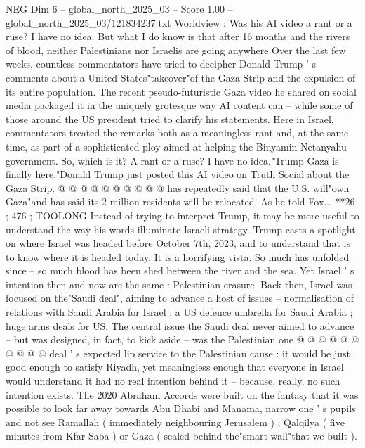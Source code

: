 \begin{textsample}{NEG Dim 6 – global\_north\_2025\_03 – Score 1.00 – global\_north\_2025\_03/121834237.txt}  \label{ex:f6_neg_171}
Worldview : Was his AI video a rant or a ruse?
I have no idea.
But what I do know is that after 16 months and the rivers of blood, neither Palestinians nor Israelis are going anywhere Over the last few weeks, countless commentators have tried to decipher Donald Trump ' s comments about a United States"takeover"of the Gaza Strip and the expulsion of its entire population.
The recent pseudo-futuristic Gaza video he shared on social media packaged it in the uniquely grotesque way AI content can -- while some of those around the US president tried to clarify his statements.
Here in Israel, commentators treated the remarks both as a meaningless rant and, at the same time, as part of a sophisticated ploy aimed at helping the Binyamin Netanyahu government.
So, which is it?
A rant or a ruse?
I have no idea."Trump Gaza is finally here."Donald Trump just posted this AI video on Truth Social about the Gaza Strip. @ @ @ @ @ @ @ @ @ @ has repeatedly said that the U.S. will"own Gaza"and has said its 2 million residents will be relocated.
As he told Fox... **26 ; 476 ; TOOLONG Instead of trying to interpret Trump, it may be more useful to understand the way his words illuminate Israeli strategy.
Trump casts a spotlight on where Israel was headed before October 7th, 2023, and to understand that is to know where it is headed today.
It is a horrifying vista.
So much has unfolded since -- so much blood has been shed between the river and the sea.
Yet Israel ' s intention then and now are the same : Palestinian erasure.
Back then, Israel was focused on the"Saudi deal", aiming to advance a host of issues -- normalisation of relations with Saudi Arabia for Israel ; a US defence umbrella for Saudi Arabia ; huge arms deals for US.
The central issue the Saudi deal never aimed to advance -- but was designed, in fact, to kick aside -- was the Palestinian one @ @ @ @ @ @ @ @ @ @ deal ' s expected lip service to the Palestinian cause : it would be just good enough to satisfy Riyadh, yet meaningless enough that everyone in Israel would understand it had no real intention behind it -- because, really, no such intention exists.
The 2020 Abraham Accords were built on the fantasy that it was possible to look far away towards Abu Dhabi and Manama, narrow one ' s pupils and not see Ramallah ( immediately neighbouring Jerusalem ) ; Qalqilya ( five minutes from Kfar Saba ) or Gaza ( sealed behind the"smart wall"that we built ).

\end{textsample}
